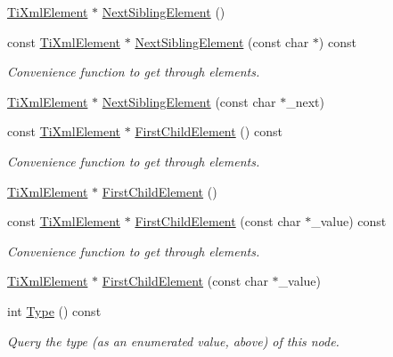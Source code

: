 \begin{DoxyCompactItemize}
\hyperlink{classTiXmlElement}{TiXmlElement} $\ast$ \hyperlink{classTiXmlNode_a1b211cb5034655a04358e0e2f6fc5010}{NextSiblingElement} ()
\item 
const \hyperlink{classTiXmlElement}{TiXmlElement} $\ast$ \hyperlink{classTiXmlNode_a3d7897999f99cf4870dd59df6331d7ff}{NextSiblingElement} (const char $\ast$) const 
\begin{DoxyCompactList}\small\item\em Convenience function to get through elements. \item\end{DoxyCompactList}\item 
\hyperlink{classTiXmlElement}{TiXmlElement} $\ast$ \hyperlink{classTiXmlNode_a6e1ac6b800e18049bc75e9f8e63a8e5f}{NextSiblingElement} (const char $\ast$\_\-next)
\item 
const \hyperlink{classTiXmlElement}{TiXmlElement} $\ast$ \hyperlink{classTiXmlNode_ab1f8d8e70d88aea4c5efedfe00862d55}{FirstChildElement} () const 
\begin{DoxyCompactList}\small\item\em Convenience function to get through elements. \item\end{DoxyCompactList}\item 
\hyperlink{classTiXmlElement}{TiXmlElement} $\ast$ \hyperlink{classTiXmlNode_aa0fecff1f3866ab33a8a25506e95db1d}{FirstChildElement} ()
\item 
const \hyperlink{classTiXmlElement}{TiXmlElement} $\ast$ \hyperlink{classTiXmlNode_a0ec361bfef1cf1978d060295f597e0d9}{FirstChildElement} (const char $\ast$\_\-value) const 
\begin{DoxyCompactList}\small\item\em Convenience function to get through elements. \item\end{DoxyCompactList}\item 
\hyperlink{classTiXmlElement}{TiXmlElement} $\ast$ \hyperlink{classTiXmlNode_a6936ae323675071808ac4840379e57f5}{FirstChildElement} (const char $\ast$\_\-value)
\item 
int \hyperlink{classTiXmlNode_a57b99d5c97d67a42b9752f5210a1ba5e}{Type} () const 
\begin{DoxyCompactList}\small\item\em Query the type (as an enumerated value, above) of this node. \item\end{DoxyCompactList}\item 

\end{DoxyCompactItemize}
